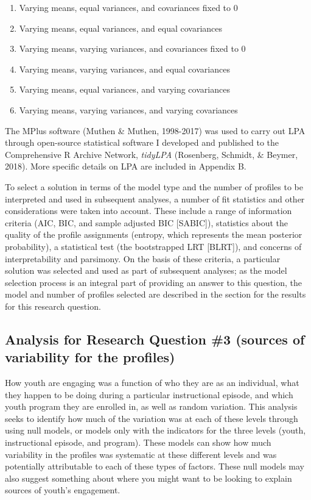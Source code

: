 \documentclass[]{book}
\providecommand{\tightlist}{%
  \setlength{\itemsep}{0pt}\setlength{\parskip}{0pt}}
\theoremstyle{definition}
\theoremstyle{definition}
\theoremstyle{definition}
\theoremstyle{remark}
\begin{document}
\begin{enumerate}
\def\labelenumi{\arabic{enumi}.}
\tightlist
\item
  Varying means, equal variances, and covariances fixed to 0
\item
  Varying means, equal variances, and equal covariances
\item
  Varying means, varying variances, and covariances fixed to 0
\item
  Varying means, varying variances, and equal covariances
\item
  Varying means, equal variances, and varying covariances
\item
  Varying means, varying variances, and varying covariances
\end{enumerate}

The MPlus software (Muthen \& Muthen, 1998-2017) was used to carry out
LPA through open-source statistical software I developed and published
to the Comprehensive R Archive Network, \emph{tidyLPA} (Rosenberg,
Schmidt, \& Beymer, 2018). More specific details on LPA are included in
Appendix B.

To select a solution in terms of the model type and the number of
profiles to be interpreted and used in subsequent analyses, a number of
fit statistics and other considerations were taken into account. These
include a range of information criteria (AIC, BIC, and sample adjusted
BIC {[}SABIC{]}), statistics about the quality of the profile
assignments (entropy, which represents the mean posterior probability),
a statistical test (the bootstrapped LRT {[}BLRT{]}), and concerns of
interpretability and parsimony. On the basis of these criteria, a
particular solution was selected and used as part of subsequent
analyses; as the model selection process is an integral part of
providing an answer to this question, the model and number of profiles
selected are described in the section for the results for this research
question.

\subsection{Analysis for Research Question \#3 (sources of variability
for the
profiles)}\label{analysis-for-research-question-3-sources-of-variability-for-the-profiles}

How youth are engaging was a function of who they are as an individual,
what they happen to be doing during a particular instructional episode,
and which youth program they are enrolled in, as well as random
variation. This analysis seeks to identify how much of the variation was
at each of these levels through using null models, or models only with
the indicators for the three levels (youth, instructional episode, and
program). These models can show how much variability in the profiles was
systematic at these different levels and was potentially attributable to
each of these types of factors. These null models may also suggest
something about where you might want to be looking to explain sources of
youth's engagement.
\end{document}
